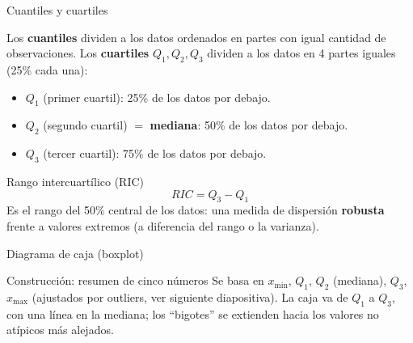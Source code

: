 \documentclass[aspectratio=169,11pt]{beamer}
\begin{document}
\begin{frame}{Cuantiles y cuartiles}
\begin{definition}
Los \textbf{cuantiles} dividen a los datos ordenados en partes con igual cantidad de observaciones. Los \textbf{cuartiles} $Q_1, Q_2, Q_3$ dividen a los datos en 4 partes iguales (25\% cada una):
\begin{itemize}
\item $Q_1$ (primer cuartil): 25\% de los datos por debajo.
\item $Q_2$ (segundo cuartil) $=$ \textbf{mediana}: 50\% de los datos por debajo.
\item $Q_3$ (tercer cuartil): 75\% de los datos por debajo.
\end{itemize}
\end{definition}
\begin{block}{Rango intercuartílico (RIC)}
\[
RIC = Q_3 - Q_1
\]
Es el rango del 50\% central de los datos: una medida de dispersión \textbf{robusta} frente a valores extremos (a diferencia del rango o la varianza).
\end{block}
\end{frame}

\begin{frame}{Diagrama de caja (boxplot)}
\begin{block}{Construcción: resumen de cinco números}
Se basa en $x_{\min}$, $Q_1$, $Q_2$ (mediana), $Q_3$, $x_{\max}$ (ajustados por outliers, ver siguiente diapositiva). La caja va de $Q_1$ a $Q_3$, con una línea en la mediana; los ``bigotes'' se extienden hacia los valores no atípicos más alejados.
\end{block}
\centering
{}
\end{frame}
\end{document}
